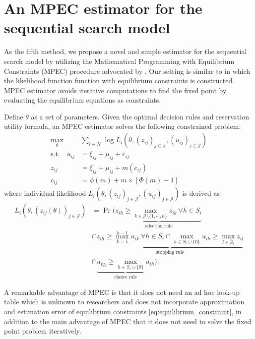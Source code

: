 \documentclass[12pt]{article}
\begin{document}
\section{An MPEC estimator for the sequential search model}
As the fifth method, we propose a novel and simple estimator for the sequential search model by utilizing the Mathematical Programming with Equilibrium Constraints (MPEC) procedure advocated by \cite{su2012constrained}. 
Our setting is similar to \cite{su2012constrained} in which the likelihood function function with equilibrium constraints is constructed. 
MPEC estimator avoids iterative computations to find the fixed point by evaluating the equilibrium equations as constraints.

Define $\theta$ as a set of parameters.
Given the optimal decision rules and reservation utility formula, an MPEC estimator solves the following constrained problem:
\begin{align}
    \max_{\theta}& \sum_{i\in \mathcal{N}} \log L_{i}(\theta,(z_{ij})_{j\in \mathcal{J}},(u_{ij})_{j\in \mathcal{J}})\nonumber\\
    \text{s.t.}\quad u_{i j} & =\xi_{i j}+\mu_{i j}+\varepsilon_{i j}\label{eq:mpec_formula}\\
    z_{i j}&=\xi_{i j}+\mu_{i j}+m\left(c_{i j}\right) \nonumber\\
    c_{i j}&=\phi(m)+m \times[\Phi(m)-1] \nonumber
\end{align}
where individual likelihood $L_{i}(\theta,(z_{ij})_{j\in \mathcal{J}},(u_{ij})_{j\in \mathcal{J}})$ is derived as
\begin{align*}
    L_{i}(\theta,(z_{ij}(\theta))_{j\in \mathcal{J}}) &= \Pr (\underbrace{z_{ih} \geq \max_{k \in \mathcal{J}\setminus \{1,\cdots,h\}} z_{ik} \: \forall h \in S_i}_{\text{selection rule}}\\
    & \cap \underbrace{z_{ih} \geq \max_{k = 1}^{h-1} u_{ik} \: \forall h \in S_i \cap \max_{h \in S_i \cup \{0\}} u_{ih} \geq \max_{l \in \bar{S}_i} z_{il} }_{\text{stopping rule}}\\
    & \cap \underbrace{u_{iy_i} \geq \max_{h \in S_i \cup \{0\}} u_{ih} }_{\text{choice rule}}).
\end{align*}

A remarkable advantage of MPEC is that it does not need an ad hoc look-up table which is unknown to researchers and does not incorporate approximation and estimation error of equilibrium constraints \eqref{eq:equilibrium_constraint}, in addition to the main advantage of MPEC that it does not need to solve the fixed point problem iteratively.
\end{document}
